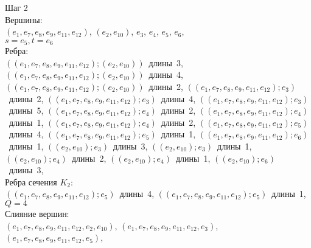 \begin{minipage}{\textwidth}
Шаг 2\\
Вершины:\\
\mbox{$(e_{1},e_{7},e_{8},e_{9},e_{11},e_{12})$},
\mbox{$(e_{2},e_{10})$},
\mbox{$e_{3}$},
\mbox{$e_{4}$},
\mbox{$e_{5}$},
\mbox{$e_{6}$},
\\
\mbox{$s=e_{5},t=e_{6}$}\\
Ребра:\\
\mbox{$((e_{1},e_{7},e_{8},e_{9},e_{11},e_{12});(e_{2},e_{10}))$ длины 3},
\mbox{$((e_{1},e_{7},e_{8},e_{9},e_{11},e_{12});(e_{2},e_{10}))$ длины 4},
\mbox{$((e_{1},e_{7},e_{8},e_{9},e_{11},e_{12});(e_{2},e_{10}))$ длины 2},
\mbox{$((e_{1},e_{7},e_{8},e_{9},e_{11},e_{12});e_{3})$ длины 2},
\mbox{$((e_{1},e_{7},e_{8},e_{9},e_{11},e_{12});e_{3})$ длины 4},
\mbox{$((e_{1},e_{7},e_{8},e_{9},e_{11},e_{12});e_{3})$ длины 5},
\mbox{$((e_{1},e_{7},e_{8},e_{9},e_{11},e_{12});e_{4})$ длины 2},
\mbox{$((e_{1},e_{7},e_{8},e_{9},e_{11},e_{12});e_{4})$ длины 1},
\mbox{$((e_{1},e_{7},e_{8},e_{9},e_{11},e_{12});e_{4})$ длины 2},
\mbox{$((e_{1},e_{7},e_{8},e_{9},e_{11},e_{12});e_{5})$ длины 4},
\mbox{$((e_{1},e_{7},e_{8},e_{9},e_{11},e_{12});e_{5})$ длины 1},
\mbox{$((e_{1},e_{7},e_{8},e_{9},e_{11},e_{12});e_{6})$ длины 1},
\mbox{$((e_{2},e_{10});e_{3})$ длины 3},
\mbox{$((e_{2},e_{10});e_{3})$ длины 1},
\mbox{$((e_{2},e_{10});e_{4})$ длины 2},
\mbox{$((e_{2},e_{10});e_{4})$ длины 1},
\mbox{$((e_{2},e_{10});e_{6})$ длины 3},
\\
Ребра сечения $K_{2}$:\\
\mbox{$((e_{1},e_{7},e_{8},e_{9},e_{11},e_{12});e_{5})$ длины 4},
\mbox{$((e_{1},e_{7},e_{8},e_{9},e_{11},e_{12});e_{5})$ длины 1},
\\
$Q=4$\\
Слияние вершин:\\
\mbox{$(e_{1},e_{7},e_{8},e_{9},e_{11},e_{12},e_{2},e_{10})$},
\mbox{$(e_{1},e_{7},e_{8},e_{9},e_{11},e_{12},e_{3})$},
\mbox{$(e_{1},e_{7},e_{8},e_{9},e_{11},e_{12},e_{5})$},
\end{minipage}
\bigskip
\noindent
